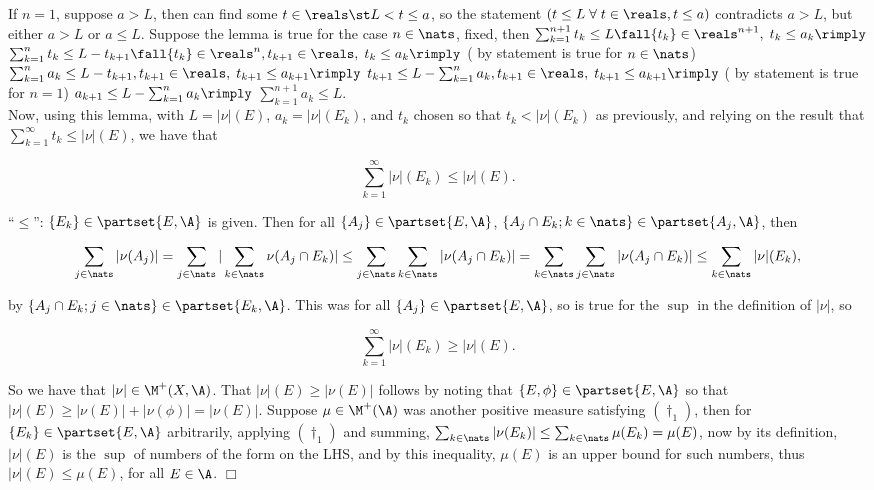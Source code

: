 \noindent
If $n=1$, suppose $a > L$, then can find some $t \in \reals \st L < t \le a$, so the statement $ \left( t \le L  \; \forall \; t \in \reals, t \le a \right)$ contradicts $a > L$, but either $a > L$ or  $a \le L$. Suppose the lemma is true for the case $n \in \nats$, fixed, then $  \sum_{k=1}^{n+1} t_k \le L  \fall \{ t_k \} \in \reals^{n+1}, \; t_k \le a_k  \rimply$
$  \sum_{k=1}^{n} t_k \le L-t_{k+1}  \fall \{ t_k \} \in \reals^{n}, t_{k+1} \in \reals, \; t_k \le a_k \rimply$ ( by statement is true for $n \in \nats$)
$  \sum_{k=1}^{n} a_k \le L-t_{k+1},  t_{k+1} \in \reals, \; t_{k+1} \le a_{k+1} \rimply$
$  t_{k+1} \le L-\sum_{k=1}^{n} a_k,  t_{k+1} \in \reals, \; t_{k+1} \le a_{k+1} \rimply$
( by statement is true for $n=1$) $a_{k+1} \le L-\sum_{k=1}^{n} a_k \rimply $  $\sum_{k=1}^{n+1} a_k \le L$. \\


\noindent
Now, using this lemma, with $L = |\nu|(E)$, $a_k = |\nu|(E_k)$, and ${t_k}$ chosen so that ${t_k} < |\nu|(E_k)$ as previously, and relying on the result that $ \sum_{k=1}^\infty t_k \le  |\nu|(E) $, we have that

$$
\sum_{k=1}^\infty |\nu|(E_k) \le |\nu|(E).
$$



\noindent
``$\le$'':  $\{ E_k \} \in \partset{ E, \A }$ is given. Then for all $\{ A_j \} \in \partset{ E, \A }$, $\{ A_j \cap E_k; k \in \nats \} \in \partset{ A_j, \A }$, then

$$
    \sum_{j \in \nats} | \nu(A_j) | = \sum_{j \in \nats} | \sum_{k \in \nats} \nu( A_j \cap E_k)| 
    \le \sum_{j \in \nats} \sum_{k \in \nats} | \nu(A_j \cap E_k) | 
    =   \sum_{k \in \nats} \sum_{j \in \nats} | \nu(A_j \cap E_k) | \le \sum_{k \in \nats} |\nu|(E_k),
$$


\noindent
by $\{ A_j \cap E_k; j \in \nats \} \in \partset{ E_k, \A }$. This was for all $\{ A_j \} \in \partset{ E, \A }$, so is true for the $\sup$ in the definition of $|\nu|$, so

$$
\sum_{k=1}^\infty |\nu|(E_k) \ge |\nu|(E).
$$

\noindent
So we have that $|\nu| \in \M^+(X, \A)$. That $|\nu|(E) \ge |\nu(E)|$ follows by noting that $ \{ E, \phi \} \in \partset{E,\A}$ so that $|\nu|(E) \ge |\nu(E)| + |\nu(\phi)| = |\nu(E)|$. Suppose $\mu \in \M^+(\A)$ was another positive measure satisfying ${(\dagger_1)}$, then for $\{ E_k \} \in \partset{E,\A}$ arbitrarily, applying ${(\dagger_1)}$ and summing, $\sum_{k \in \nats} |\nu(E_k)| \le \sum_{k \in \nats} \mu(E_k) = \mu(E)$, now by its definition, $|\nu|(E)$ is the $\sup$ of numbers of the form on the LHS, and by this inequality, $\mu(E)$ is an upper bound for such numbers, thus $|\nu|(E) \le \mu(E)$, for all $E \in \A$.  $\Box$ \\

